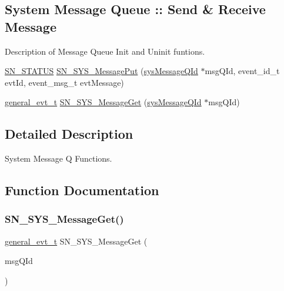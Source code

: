 \subsection*{System Message Queue \+:\+: Send \& Receive Message}
\label{_amgrpd18af7b92638589f4b28979ebfbdf27b}%
Description of Message Queue Init and Uninit funtions. \begin{DoxyCompactItemize}
\item 
\hyperlink{group__SYSTEM__ERROR_ga4540713b9a7a18ce44d78c3a10f7442f}{S\+N\+\_\+\+S\+T\+A\+T\+US} \hyperlink{group__SYSTEM__MESSAGE__Q_ga36e115419d4cbbfe4a6bde6e3fecf180}{S\+N\+\_\+\+S\+Y\+S\+\_\+\+Message\+Put} (\hyperlink{structsys__message__queue}{sys\+Message\+Q\+Id} $\ast$msg\+Q\+Id, event\+\_\+id\+\_\+t evt\+Id, event\+\_\+msg\+\_\+t evt\+Message)
\item 
\hyperlink{structgeneral__event}{general\+\_\+evt\+\_\+t} \hyperlink{group__SYSTEM__MESSAGE__Q_gafb2da611b3c93f1f906109e7737d67cf}{S\+N\+\_\+\+S\+Y\+S\+\_\+\+Message\+Get} (\hyperlink{structsys__message__queue}{sys\+Message\+Q\+Id} $\ast$msg\+Q\+Id)
\end{DoxyCompactItemize}


\subsection{Detailed Description}
System Message Q Functions. 



\subsection{Function Documentation}
\mbox{\label{group__SYSTEM__MESSAGE__Q_gafb2da611b3c93f1f906109e7737d67cf}} 
\subsubsection{\texorpdfstring{S\+N\+\_\+\+S\+Y\+S\+\_\+\+Message\+Get()}{SN\_SYS\_MessageGet()}}
{\footnotesize\ttfamily \hyperlink{structgeneral__event}{general\+\_\+evt\+\_\+t} S\+N\+\_\+\+S\+Y\+S\+\_\+\+Message\+Get (\begin{DoxyParamCaption}\item[{\hyperlink{structsys__message__queue}{sys\+Message\+Q\+Id} $\ast$}]{msg\+Q\+Id }\end{DoxyParamCaption})}



